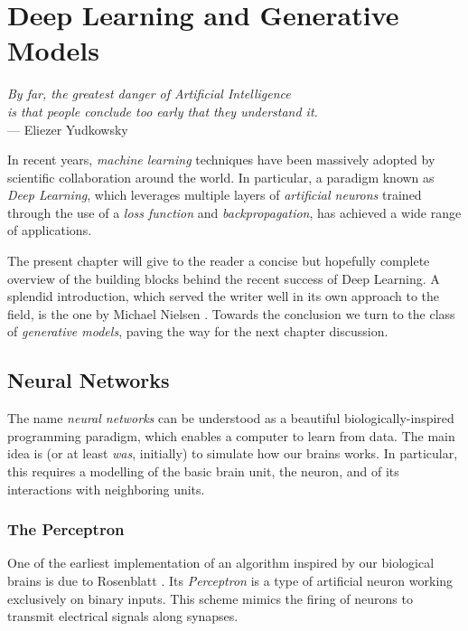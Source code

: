 \chapter{Deep Learning and Generative Models}\label{ch:dlgm}
\begin{flushright}{\slshape
        By far, the greatest danger of Artificial Intelligence \\
        is that people conclude too early that they understand it.} \\ \medskip
    --- Eliezer Yudkowsky
\end{flushright}

In recent years, \emph{machine learning} techniques have been massively adopted by scientific collaboration around the world. In particular, a paradigm known as \emph{Deep Learning}, which leverages multiple layers of \emph{artificial neurons} trained through the use of a \emph{loss function} and \emph{backpropagation}, has achieved a wide range of applications.

The present chapter will give to the reader a concise but hopefully complete overview of the building blocks behind the recent success of Deep Learning. A splendid introduction, which served the writer well in its own approach to the field, is the one by Michael Nielsen \cite{nielsenneural}. Towards the conclusion we turn to the class of \emph{generative models}, paving the way for the next chapter discussion.
	

\section{Neural Networks}

The name \emph{neural networks} can be understood as a beautiful biologically-inspired programming paradigm, which enables a computer to learn from data. The main idea is (or at least \emph{was}, initially) to simulate how our brains works. In particular, this requires a modelling of the basic brain unit, the neuron, and of its interactions with neighboring units.

\subsection{The Perceptron}

One of the earliest implementation of an algorithm inspired  by our biological brains is due to Rosenblatt \cite{Rosenblatt1958ThePA}. Its \emph{Perceptron} is a type of artificial neuron working exclusively on binary inputs. This scheme mimics the firing of neurons to transmit electrical signals along synapses.


